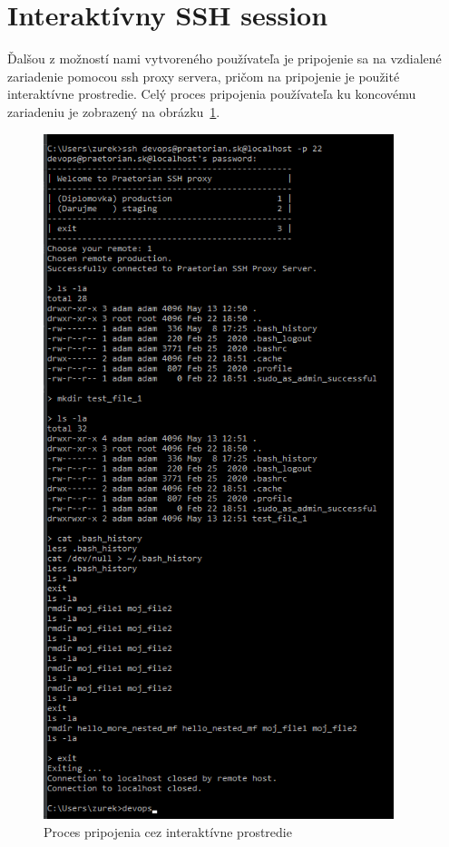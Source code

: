 \section{Interaktívny SSH session}\label{sec:interaktivny-ssh-session}

Ďalšou z možností nami vytvoreného používateľa je pripojenie sa na vzdialené zariadenie pomocou ssh proxy servera, pričom na
pripojenie je použité interaktívne prostredie.
Celý proces pripojenia používateľa ku koncovému zariadeniu je zobrazený na obrázku~\ref{fig:obr_16}.

\begin{figure}[H]
\begin{center}\includegraphics[width=\textwidth,height=20cm,keepaspectratio=true]{assets/interactive_session.png}\end{center}
\caption[Proces pripojenia cez interaktívne prostredie]{Proces pripojenia cez interaktívne prostredie}\label{fig:obr_16}
\end{figure}

